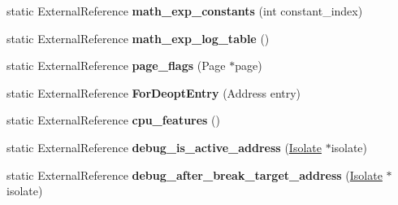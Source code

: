 \begin{DoxyCompactItemize}
\item 
\hypertarget{classv8_1_1internal_1_1_b_a_s_e___e_m_b_e_d_d_e_d_a0c95d3091b1824067b8a249db51afa7a}{}static External\+Reference {\bfseries math\+\_\+exp\+\_\+constants} (int constant\+\_\+index)\label{classv8_1_1internal_1_1_b_a_s_e___e_m_b_e_d_d_e_d_a0c95d3091b1824067b8a249db51afa7a}

\item 
\hypertarget{classv8_1_1internal_1_1_b_a_s_e___e_m_b_e_d_d_e_d_a3942f651083a6f76849c065931d11040}{}static External\+Reference {\bfseries math\+\_\+exp\+\_\+log\+\_\+table} ()\label{classv8_1_1internal_1_1_b_a_s_e___e_m_b_e_d_d_e_d_a3942f651083a6f76849c065931d11040}

\item 
\hypertarget{classv8_1_1internal_1_1_b_a_s_e___e_m_b_e_d_d_e_d_a01dedf4ad028c646f5df35876b912674}{}static External\+Reference {\bfseries page\+\_\+flags} (Page $\ast$page)\label{classv8_1_1internal_1_1_b_a_s_e___e_m_b_e_d_d_e_d_a01dedf4ad028c646f5df35876b912674}

\item 
\hypertarget{classv8_1_1internal_1_1_b_a_s_e___e_m_b_e_d_d_e_d_ab1ff83bab2c3d06196a25b94e54cf0dd}{}static External\+Reference {\bfseries For\+Deopt\+Entry} (Address entry)\label{classv8_1_1internal_1_1_b_a_s_e___e_m_b_e_d_d_e_d_ab1ff83bab2c3d06196a25b94e54cf0dd}

\item 
\hypertarget{classv8_1_1internal_1_1_b_a_s_e___e_m_b_e_d_d_e_d_a07fbafa6bcc67aa4756645b0a977ea93}{}static External\+Reference {\bfseries cpu\+\_\+features} ()\label{classv8_1_1internal_1_1_b_a_s_e___e_m_b_e_d_d_e_d_a07fbafa6bcc67aa4756645b0a977ea93}

\item 
\hypertarget{classv8_1_1internal_1_1_b_a_s_e___e_m_b_e_d_d_e_d_ad927b4f11290850b59157aff105c3b4d}{}static External\+Reference {\bfseries debug\+\_\+is\+\_\+active\+\_\+address} (\hyperlink{classv8_1_1internal_1_1_isolate}{Isolate} $\ast$isolate)\label{classv8_1_1internal_1_1_b_a_s_e___e_m_b_e_d_d_e_d_ad927b4f11290850b59157aff105c3b4d}

\item 
\hypertarget{classv8_1_1internal_1_1_b_a_s_e___e_m_b_e_d_d_e_d_ab8c0bc06f00270e66a116df470c8661f}{}static External\+Reference {\bfseries debug\+\_\+after\+\_\+break\+\_\+target\+\_\+address} (\hyperlink{classv8_1_1internal_1_1_isolate}{Isolate} $\ast$isolate)\label{classv8_1_1internal_1_1_b_a_s_e___e_m_b_e_d_d_e_d_ab8c0bc06f00270e66a116df470c8661f}


\end{DoxyCompactItemize}
